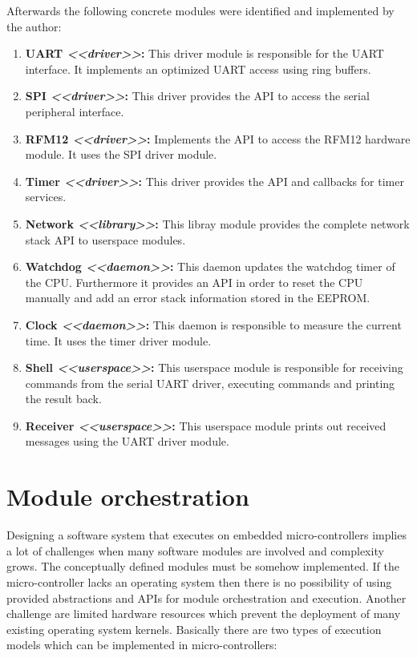 Afterwards the following concrete modules were identified and implemented by the author:

\begin{enumerate}
    \item \textbf{UART \emph{<<driver>>}:} This driver module is responsible for the UART interface. It implements an optimized UART access using ring buffers.
    \item \textbf{SPI \emph{<<driver>>}:} This driver provides the API to access the serial peripheral interface.
    \item \textbf{RFM12 \emph{<<driver>>}:} Implements the API to access the RFM12 hardware module. It uses the SPI driver module.
    \item \textbf{Timer \emph{<<driver>>}:} This driver provides the API and callbacks for timer services.
    \item \textbf{Network \emph{<<library>>}:} This libray module provides the complete network stack API to userspace modules.
    \item \textbf{Watchdog \emph{<<daemon>>}:} This daemon updates the watchdog timer of the CPU. Furthermore it provides an API in order to reset the CPU manually and add an error stack information stored in the EEPROM.
    \item \textbf{Clock \emph{<<daemon>>}:} This daemon is responsible to measure the current time. It uses the timer driver module.
    \item \textbf{Shell \emph{<<userspace>>}:} This userspace module is responsible for receiving commands from the serial UART driver, executing commands and printing the result back.
    \item \textbf{Receiver \emph{<<userspace>>}:} This userspace module prints out received messages using the UART driver module.
\end{enumerate}

\section{Module orchestration}%
Designing a software system that executes on embedded micro-controllers implies a lot of challenges when many software modules are involved and complexity grows. The conceptually defined modules must be somehow implemented. If the micro-controller lacks an operating system then there is no possibility of using provided abstractions and APIs for module orchestration and execution. Another challenge are limited hardware resources which prevent the deployment of many existing operating system kernels. Basically there are two types of execution models which can be implemented in micro-controllers:

